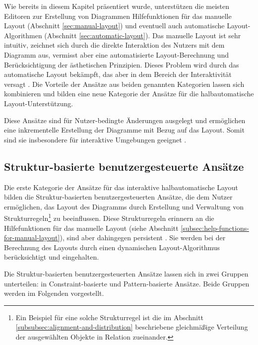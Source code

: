 Wie bereits in diesem Kapitel präsentiert wurde, unterstützen die meisten Editoren zur Erstellung von Diagrammen Hilfefunktionen für das manuelle Layout (Abschnitt \ref{sec:manual-layout}) und eventuell auch automatische Layout-Algorithmen (Abschnitt \ref{sec:automatic-layout}). Das manuelle Layout ist sehr intuitiv, zeichnet sich durch die direkte Interaktion des Nutzers mit dem Diagramm aus, vermisst aber eine automatisierte Layout-Berechnung und Berücksichtigung der ästhetischen Prinzipien. Dieses Problem wird durch das automatische Layout bekämpft, das aber in dem Bereich der Interaktivität versagt \cite{GladischSchumann14Semi-Automatic}. Die Vorteile der Ansätze aus beiden genannten Kategorien lassen sich kombinieren und bilden eine neue Kategorie der Ansätze für die halbautomatische Layout-Unterstützung.

Diese Ansätze sind für Nutzer-bedingte Änderungen ausgelegt und ermöglichen eine inkrementelle Erstellung der Diagramme mit Bezug auf das Layout. Somit sind sie insbesondere für interaktive Umgebungen geeignet \cite{Arvo02Techniques, GladischSchumann14Semi-Automatic, Wybrow08Using}.



\subsection{Struktur-basierte benutzergesteuerte Ansätze}
\label{subsec:structure-based-user-controlled-approaches}

Die erste Kategorie der Ansätze für das interaktive halbautomatische Layout bilden die Struktur-basierten benutzergesteuerten Ansätze, die dem Nutzer ermöglichen, das Layout des Diagramms durch Erstellung und Verwaltung von Strukturregeln\footnote{Ein Beispiel für eine solche Strukturregel ist die im Abschnitt \ref{subsubsec:alignment-and-distribution} beschriebene gleichmäßige Verteilung der ausgewählten Objekte in Relation zueinander.} zu beeinflussen. Diese Strukturregeln erinnern an die Hilfefunktionen für das manuelle Layout (siehe Abschnitt \ref{subsec:help-functions-for-manual-layout}), sind aber dahingegen persistent \cite{Wybrow08Using}. Sie werden bei der Berechnung des Layouts durch einen dynamischen Layout-Algorithmus berücksichtigt und eingehalten.

Die Struktur-basierten benutzergesteuerten Ansätze lassen sich in zwei Gruppen unterteilen: in Constraint-basierte und Pattern-basierte Ansätze. Beide Gruppen werden im Folgenden vorgestellt.


